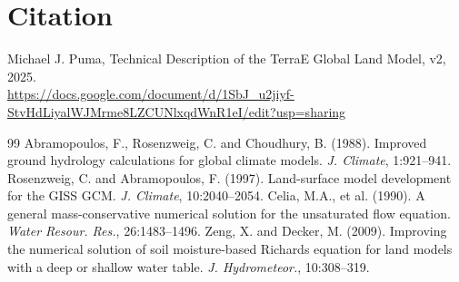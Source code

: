 \documentclass[11pt,a4paper]{article}
\begin{document}
\section*{Citation}

Michael J. Puma, Technical Description of the TerraE Global Land Model, v2, 2025.\\
\url{https://docs.google.com/document/d/1SbJ_u2jiyf-StvHdLiyalWJMrme8LZCUNlxqdWnR1eI/edit?usp=sharing}


\begin{thebibliography}{99}
 Abramopoulos, F., Rosenzweig, C. and Choudhury, B. (1988). Improved ground hydrology calculations for global climate models. \textit{J. Climate}, 1:921--941.
 Rosenzweig, C. and Abramopoulos, F. (1997). Land-surface model development for the GISS GCM. \textit{J. Climate}, 10:2040--2054.
 Celia, M.A., et al. (1990). A general mass-conservative numerical solution for the unsaturated flow equation. \textit{Water Resour. Res.}, 26:1483--1496.
 Zeng, X. and Decker, M. (2009). Improving the numerical solution of soil moisture-based Richards equation for land models with a deep or shallow water table. \textit{J. Hydrometeor.}, 10:308--319.
\end{thebibliography}
\end{document}
